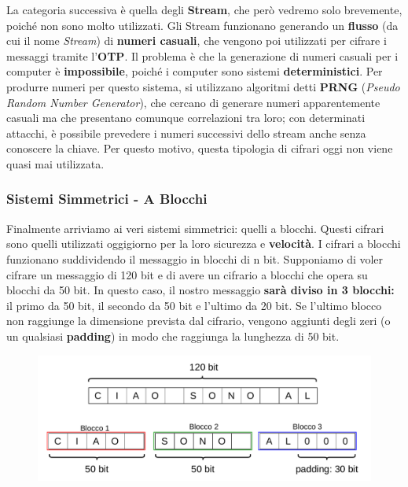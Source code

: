 \documentclass{rapport}
\begin{document}
La categoria successiva è quella degli \textbf{Stream}, che però vedremo solo brevemente, poiché non sono molto utilizzati. Gli Stream funzionano generando un \textbf{flusso} (da cui il nome \textit{Stream}) di \textbf{numeri casuali}, che vengono poi utilizzati per cifrare i messaggi tramite l’\textbf{OTP}. Il problema è che la generazione di numeri casuali per i computer è \textbf{impossibile}, poiché i computer sono sistemi \textbf{deterministici}. Per produrre numeri per questo sistema, si utilizzano algoritmi detti \textbf{PRNG} (\textit{Pseudo Random Number Generator}), che cercano di generare numeri apparentemente casuali ma che presentano comunque correlazioni tra loro; con determinati attacchi, è possibile prevedere i numeri successivi dello stream anche senza conoscere la chiave. Per questo motivo, questa tipologia di cifrari oggi non viene quasi mai utilizzata.


\newpage
\subsubsection{Sistemi Simmetrici - A Blocchi}

Finalmente arriviamo ai veri sistemi simmetrici: quelli a blocchi. Questi cifrari sono quelli utilizzati oggigiorno per la loro sicurezza e \textbf{velocità}. I cifrari a blocchi funzionano suddividendo il messaggio in blocchi di n bit. Supponiamo di voler cifrare un messaggio di 120 bit e di avere un cifrario a blocchi che opera su blocchi da 50 bit. In questo caso, il nostro messaggio \textbf{sarà diviso in 3 blocchi:} il primo da 50 bit, il secondo da 50 bit e l’ultimo da 20 bit. Se l’ultimo blocco non raggiunge la dimensione prevista dal cifrario, vengono aggiunti degli zeri (o un qualsiasi \textbf{padding}) in modo che raggiunga la lunghezza di 50 bit.


\begin{figure}[h]
    \centering
    \includegraphics[width=\linewidth]{logos/0_6_cripto.pdf}
\end{figure}
\end{document}
